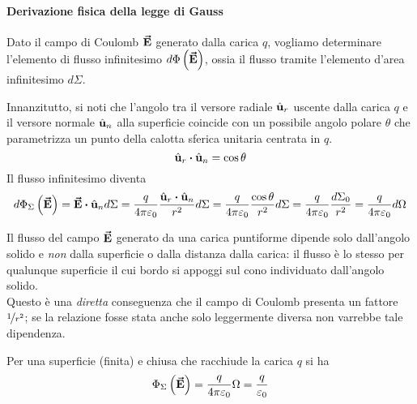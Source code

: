 \paragraph{Derivazione fisica della legge di Gauss}
Dato il campo di Coulomb $\vb*{\va{E}}$ generato dalla carica $q$, vogliamo determinare l'elemento di flusso infinitesimo $d\Phi\left(\vb*{\va{E}}\right)$, ossia il flusso tramite l'elemento d'area infinitesimo $d\Sigma$.

Innanzitutto, si noti che l'angolo tra il versore radiale $\hat{\mathbf{u}}_r$ uscente dalla carica $q$ e il versore normale $\hat{\mathbf{u}}_n$ alla superficie coincide con un possibile angolo polare $\theta$ che parametrizza un punto della calotta sferica unitaria centrata in $q$.
\begin{equation*}
\vbh{u}_r\vdot\vbh{u}_n=\cos\theta
\end{equation*}
Il flusso infinitesimo diventa
\begin{equation*}
	d\Phi_{\Sigma}\left(\vba{E}\right)=\vba{E}\vdot\vbh{u}_nd\Sigma=\frac{q}{4\pi\epsilon_0}\frac{\vbh{u}_r\vdot\vbh{u}_n}{r^2}d\Sigma=\frac{q}{4\pi\epsilon_0}\frac{\cos\theta}{r^2}d\Sigma=\frac{q}{4\pi\epsilon_0}\frac{d\Sigma_0}{r^2}=\frac{q}{4\pi\epsilon_0}d\Omega
\end{equation*}
\begin{observe}
	Il flusso del campo $\vb*{\va{E}}$ generato da una carica puntiforme dipende solo dall'angolo solido e \textit{non} dalla superficie o dalla distanza dalla carica: il flusso è lo stesso per qualunque superficie il cui bordo si appoggi sul cono individuato dall'angolo solido.\\
	Questo è una \textit{diretta} conseguenza che il campo di Coulomb presenta un fattore $\nicefrac{1}{r^2}$; se la relazione fosse stata anche solo leggermente diversa non varrebbe tale dipendenza.
\end{observe}
Per una superficie (finita) e chiusa che racchiude la carica $q$ si ha
 \begin{equation*}
 	\Phi_\Sigma\left(\vb*{\va{E}}\right)=\frac{q}{4\pi\varepsilon_0}\Omega=\frac{q}{\varepsilon_0}
 \end{equation*}

